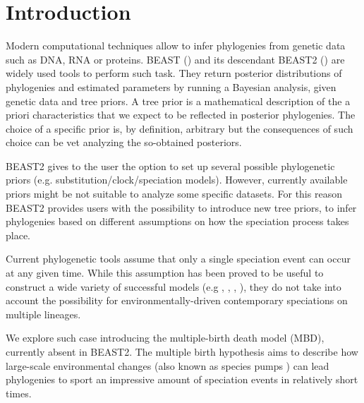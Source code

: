 \section{Introduction}


Modern computational techniques allow to infer phylogenies from genetic data 
such as DNA, RNA or proteins. BEAST (\cite{beast}) and its descendant 
BEAST2 (\cite{beast2}) are widely used tools to perform such task. They 
return posterior distributions of phylogenies and estimated parameters by running a Bayesian analysis, given genetic data and tree priors. A tree prior is a mathematical description of the a priori characteristics that we expect to be reflected in posterior phylogenies. The choice of a specific prior is, by definition, arbitrary but the consequences of such choice can be vet analyzing the so-obtained posteriors.

BEAST2 gives to the user the option to set up several possible phylogenetic priors (e.g. substitution/clock/speciation models). However, currently available priors might be not suitable to analyze some specific datasets.
For this reason BEAST2 provides users with the possibility to introduce new tree priors, to infer phylogenies based on different assumptions on how the speciation process takes place.

Current phylogenetic tools assume that only a single speciation event can occur at any given time.
While this assumption has been proved to be useful to construct a wide variety of successful models (e.g \cite{Maddison2007biSSE}, \cite{Valente2015}, \cite{etienne2012diversity}, \cite{etienne2014estimating}), they do not take into account the possibility for environmentally-driven contemporary speciations on multiple lineages.

We explore such case introducing the multiple-birth death model (MBD), currently absent in BEAST2. The multiple birth hypothesis aims to describe how large-scale environmental changes (also known as species pumps ) can lead phylogenies to sport an impressive amount of speciation events in relatively short times.

\iffalse
\giovanni{This might be good for the abstract}
The (constant-rate) birth-death (BD) model embodies the common assumption that only a single speciation event can occur at any given time. The multiple-birth-death (MBD) model relaxes this assumption allowing, in addition to standard BD events, also events in which large-scale environmental changes lead to speciation bursts.
\fi

